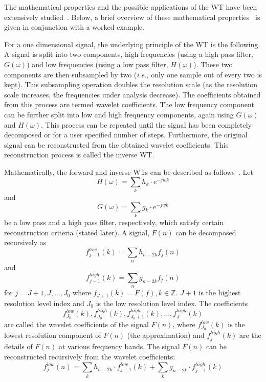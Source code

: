 \documentclass[12pt]{report}
\begin{document}
The mathematical properties and the possible applications of the WT have been extensively 
studied~\cite{b_b_hub, graps, chuiAndyWav, daub1AndyWav, daub2AndyWav, ruskaiAndyWav, mallatAndyWav}.
Below, a brief overview of these mathematical properties~\cite{meerMasters} is given in conjunction with a worked example.

For a one dimensional signal, the underlying principle of the WT is the following. A signal
is split into two components, high frequencies (using a high pass filter, $G(\omega)$) and
low frequencies (using a low pass filter, $H(\omega)$). 
These two components are then subsampled by two (\emph{i.e.}, only one sample out of every two
is kept). This subsampling operation doubles the resolution scale (as the resolution scale increases, 
the frequencies under analysis decrease).
The coefficients obtained from this process are termed wavelet coefficients.
The low frequency component can be further split into low and high frequency components, again
using $G(\omega)$ and $H(\omega)$. This process can be repeated until the signal has been completely
decomposed or for a user specified number of steps. 
Furthermore, the original signal can be reconstructed from the obtained wavelet coefficients.
This reconstruction process is called the inverse WT.

Mathematically, the forward and inverse WTs can be described as follows~\cite{meerMasters}. Let 
\begin{equation}
	H(\omega)=\sum_{k}h_{k} \cdot e^{-jwk}
\end{equation}
and
\begin{equation}
        G(\omega)=\sum_{k}g_{k} \cdot e^{-jwk}
\end{equation}
be a low pass and a high pass filter, respectively, which satisfy certain reconstruction
criteria (stated later). A signal, $F(n)$ can be decomposed recursively as
\begin{equation}
	f^{low}_{j-1}(k)=\sum_{n}h_{n-2k}f_{j}(n)
\end{equation}
and
\begin{equation}
	f^{high}_{j-1}(k)=\sum_{n}g_{n-2k}f_{j}(n)
\end{equation}
for $j=J+1, J, \ldots, J_{0}$ where $f_{J+1}(k)=F(f), k \in \mathbb{Z}$. $J+1$ is the highest resolution level index
and $J_{0}$ is the low resolution level index. The coefficients
\begin{equation}
	f^{low}_{J_{0}}(k), f^{high}_{J_{0}}(k), f^{high}_{J_{0}+1}(k), \ldots, f^{high}_{J}(k)
\end{equation}
are called the wavelet coefficients of the signal $F(n)$, where $f^{low}_{J_{0}}(k)$ is the 
lowest resolution component of $F(n)$ (the approximation) and $f^{high}_{j}(k)$ are the 
details of $F(n)$ at various frequency bands. The signal $F(n)$ can be reconstructed recursively 
from the wavelet coefficients:
\begin{equation} 
	f^{low}_{j}(n)=\sum_{k} h_{n-2k} \cdot f^{low}_{j-1}(k) + \sum_{k} g_{n-2k} \cdot f^{high}_{j-1}(k)
\end{equation}    
\end{document}
